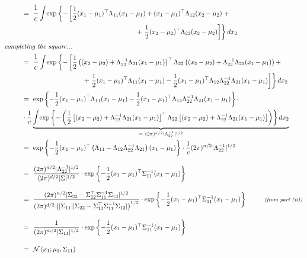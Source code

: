 \documentclass[twoside,11pt]{homework}
\DeclarePairedDelimiter{\2norm}{\lVert}{\rVert^2_2}
\newcommand{\1}[1]{\mathds{1}\left[#1\right]}
\begin{document}
\begin{align*}
& = \ \mathlarger{\frac{1}{c} \int} \text{exp} \left\lbrace-\left[ \frac{1}{2}(x_1 - \mu_1)^{\top}\Lambda_{11}(x_1-\mu_1)  +  (x_1 - \mu_1)^{\top}\Lambda_{12}(x_2-\mu_2) \ + \right. \right. \\
& \ \ \ \ \ \ \ \ \ \ \ \ \ \ \ \ \ \ \ \ \ \ \ \ \ \ \ \ \ \ \ \ \ \ \ \ \ \ \ \ \ \ \ \ \ \ \ \ \ \ \ \left. \left. + \ \frac{1}{2}(x_2 - \mu_2)^{\top}\Lambda_{22}(x_2-\mu_2)\right] \right\rbrace dx_2 \\
\intertext{\emph{completing the square...}}
\ \ \ \ \ \ \ \ & =  \ \mathlarger{\frac{1}{c} \int} \text{exp} \left\lbrace-\left[ \frac{1}{2}\left((x_2 - \mu_2) +\Lambda_{22}^{-1}\Lambda_{21}(x_1-\mu_1)\right)^{\top} \Lambda_{22}\left((x_2-\mu_2) + \Lambda_{22}^{-1}\Lambda_{21}(x_1-\mu_1)\right)  + \right. \right. \\
&  \ \ \ \ \ \ \ \ \ \ \ \ \ \ \ \ \ \ \ \ \ \ \ \ \ \ \ \left. \left. + \ \frac{1}{2}(x_1-\mu_1)^{\top}\Lambda_{11}( x_1-\mu_1) - \frac{1}{2}(x_1-\mu_1)^{\top}\Lambda_{12}\Lambda_{22}^{-1}\Lambda_{21}( x_1-\mu_1) \right] \right\rbrace dx_2 \\
& = \ \text{exp}\left\lbrace -\frac{1}{2}(x_1-\mu_1)^{\top}\Lambda_{11}( x_1-\mu_1) - \frac{1}{2}(x_1-\mu_1)^{\top}\Lambda_{12}\Lambda_{22}^{-1}\Lambda_{21}( x_1-\mu_1) \right\rbrace \cdot\\
& \cdot \frac{1}{c}\underbrace{\mathlarger{\int}\text{exp}\left\lbrace  -\left( \frac{1}{2}\left[(x_2 - \mu_2) +\Lambda_{22}^{-1}\Lambda_{21}(x_1-\mu_1)\right]^{\top} \Lambda_{22}\left[(x_2-\mu_2) + \Lambda_{22}^{-1}\Lambda_{21}(x_1-\mu_1)\right] \right) \right\rbrace dx_2}_{= \ (2\pi)^{n/2}|\Lambda_{22}^{-1}|^{1/2}} \\
& = \ \text{exp}\left\lbrace -\frac{1}{2}(x_1-\mu_1)^{\top}\left(\Lambda_{11} - \Lambda_{12}\Lambda_{22}^{-1}\Lambda_{21}\right)( x_1-\mu_1) \right\rbrace \cdot \frac{1}{c}(2\pi)^{n/2}|\Lambda_{22}^{-1}|^{1/2}\\[1em]
& = \ \frac{(2\pi)^{n/2}|\Lambda_{22}^{-1}|^{1/2}}{(2\pi)^{d/2}|\Sigma|^{1/2}} \cdot \text{exp}\left\lbrace -\frac{1}{2}(x_1-\mu_1)^{\top}\Sigma_{11}^{-1}( x_1-\mu_1) \right\rbrace  \\[1em]
& =  \ \frac{(2\pi)^{n/2}|\Sigma_{22} - \Sigma_{12}^{\top}\Sigma_{11}^{-1}\Sigma_{12}|^{1/2}}{(2\pi)^{d/2}\left(|\Sigma_{11}||\Sigma_{22} - \Sigma_{12}^{\top}\Sigma_{11}^{-1}\Sigma_{12}|\right)^{1/2}} \cdot \text{exp}\left\lbrace -\frac{1}{2}(x_1-\mu_1)^{\top}\Sigma_{11}^{-1}( x_1-\mu_1) \right\rbrace   \ \ \ \ \ \ \ \ \text{\footnotesize \emph{(from part (ii))}} \\[1em]
& = \ \frac{1}{(2\pi)^{m/2}|\Sigma_{11}|^{1/2}} \cdot \text{exp}\left\lbrace -\frac{1}{2}(x_1-\mu_1)^{\top}\Sigma_{11}^{-1}( x_1-\mu_1) \right\rbrace     \\[1em]
& = \ \mathcal{N}\left(x_1; \mu_1, \Sigma_{11}\right) 
\end{align*}
\text{}
\end{document}
